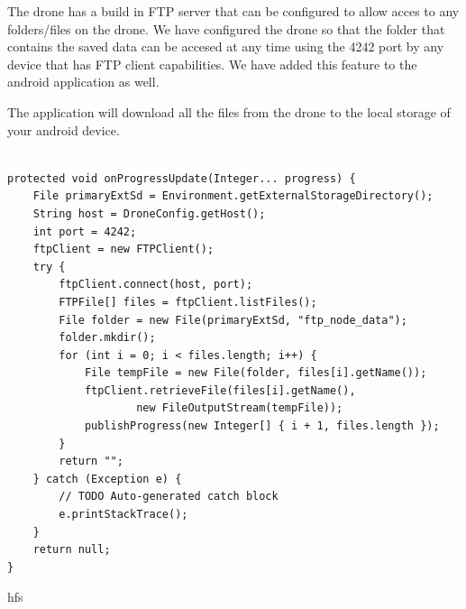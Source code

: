 The drone has a build in FTP server that can be configured to allow acces to any folders/files on the drone. We have configured the drone so that the folder that contains the saved data can be accesed at any time using the 4242 port by any device that has FTP client capabilities. We have added this feature to the android application as well.

The application will download all the files from the drone to the local storage of your android device.


\begin{lstlisting}

protected void onProgressUpdate(Integer... progress) {
	File primaryExtSd = Environment.getExternalStorageDirectory();
	String host = DroneConfig.getHost();
	int port = 4242;
	ftpClient = new FTPClient();
	try {
		ftpClient.connect(host, port);
		FTPFile[] files = ftpClient.listFiles();
		File folder = new File(primaryExtSd, "ftp_node_data");
		folder.mkdir();
		for (int i = 0; i < files.length; i++) {
			File tempFile = new File(folder, files[i].getName());
			ftpClient.retrieveFile(files[i].getName(),
					new FileOutputStream(tempFile));
			publishProgress(new Integer[] { i + 1, files.length });
		}
		return "";
	} catch (Exception e) {
		// TODO Auto-generated catch block
		e.printStackTrace();
	}
	return null;
}
\end{lstlisting}
hfs

